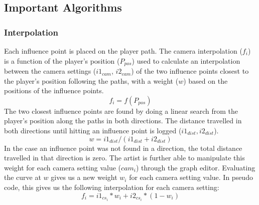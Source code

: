 \subsection{Important Algorithms}
\subsubsection{Interpolation} \label{interpolationChapter}
Each influence point is placed on the player path. The camera interpolation ($f_{i}$) is a function of the player's position ($P_{pos}$) used to calculate an interpolation between the camera settings ($i1_{cam}$, $i2_{cam}$) of the two influence points closest to the player's position following the paths, with a weight ($w$) based on the positions of the influence points.
\begin{equation}
f_{i} = f(P_{pos})
\end{equation}
The two closest influence points are found by doing a linear search from the player's position along the paths in both directions. The distance travelled in both directions until hitting an influence point is logged ($i1_{dist}, i2_{dist}$).
\begin{equation}
w = i1_{dist}/(i1_{dist} + i2_{dist})
\end{equation}
In the case an influence point was not found in a direction, the total distance travelled in that direction is zero. The artist is further able to manipulate this weight for each camera setting value ($cam_{i}$) through the graph editor. Evaluating the curve at $w$ gives us a new weight $w_{i}$ for each camera setting value. In pseudo code, this gives us the following interpolation for each camera setting:
\begin{equation}
f_{i} = i1_{cs_{i}} * w_{i} + i2_{cs_{i}} * (1-w_{i})
\end{equation}
